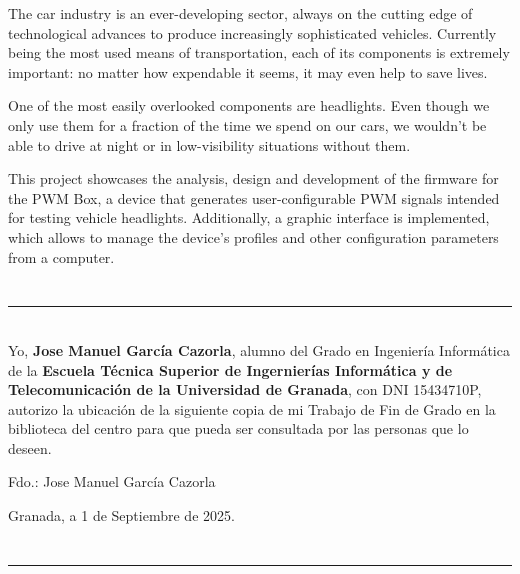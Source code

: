 The car industry is an ever-developing sector, always on the cutting edge of technological advances to produce increasingly sophisticated vehicles. Currently being the most used means of transportation, each of its components is extremely important: no matter how expendable it seems, it may even help to save lives.

One of the most easily overlooked components are headlights. Even though we only use them for a fraction of the time we spend on our cars, we wouldn't be able to drive at night or in low-visibility situations without them.

This project showcases the analysis, design and development of the firmware for the PWM Box, a device that generates user-configurable PWM signals intended for testing vehicle headlights. Additionally, a graphic interface is implemented, which allows to manage the device's profiles and other configuration parameters from a computer.

\chapter*{}
\thispagestyle{empty}

\noindent\rule[-1ex]{\textwidth}{2px}\\[4.5ex]

Yo, \textbf{Jose Manuel García Cazorla}, alumno del Grado en Ingeniería Informática de la \textbf{Escuela Técnica Superior de Ingernierías Informática y de Telecomunicación de la Universidad de Granada}, con DNI 15434710P, autorizo la ubicación de la siguiente copia de mi Trabajo de Fin de Grado en la biblioteca del centro para que pueda ser consultada por las personas que lo deseen.

\vspace{6cm}

\noindent Fdo.: Jose Manuel García Cazorla

\vspace{2cm}

\begin{flushright}
    Granada, a 1 de Septiembre de 2025.
\end{flushright}

\chapter*{}
\thispagestyle{empty}

\noindent\rule[-1ex]{\textwidth}{2px}\\[4.5ex]

